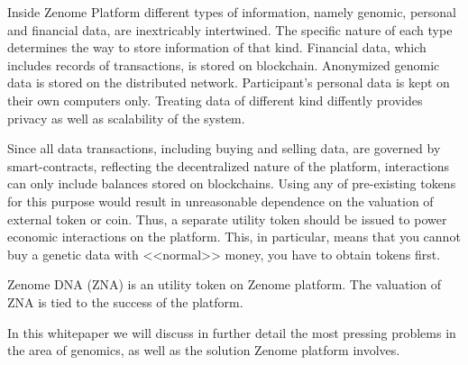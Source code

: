 
Inside Zenome Platform different types of information, namely genomic, personal and financial data, are inextricably intertwined. The specific nature of each type determines the way to store information of that kind. Financial data, which includes records of transactions, is stored on blockchain. Anonymized genomic data is stored on the distributed network. Participant's personal data is kept on their own computers only. Treating data of different kind diffently provides privacy as well as scalability of the system.

Since all data transactions, including buying and selling data, are governed by smart-contracts, reflecting the decentralized nature of the platform, interactions can only include balances stored on blockchains. Using any of pre-existing tokens for this purpose would result in unreasonable dependence on the valuation of external token or coin. Thus, a separate utility token should be issued to power economic interactions on the platform. This, in particular, means that you cannot buy a genetic data with <<normal>> money, you have to obtain tokens first.

Zenome DNA (ZNA) is an utility token on Zenome platform. The valuation of ZNA is tied to the success of the platform.

In this whitepaper we will discuss in further detail the most pressing problems in the area of genomics, as well as the solution Zenome platform involves.
